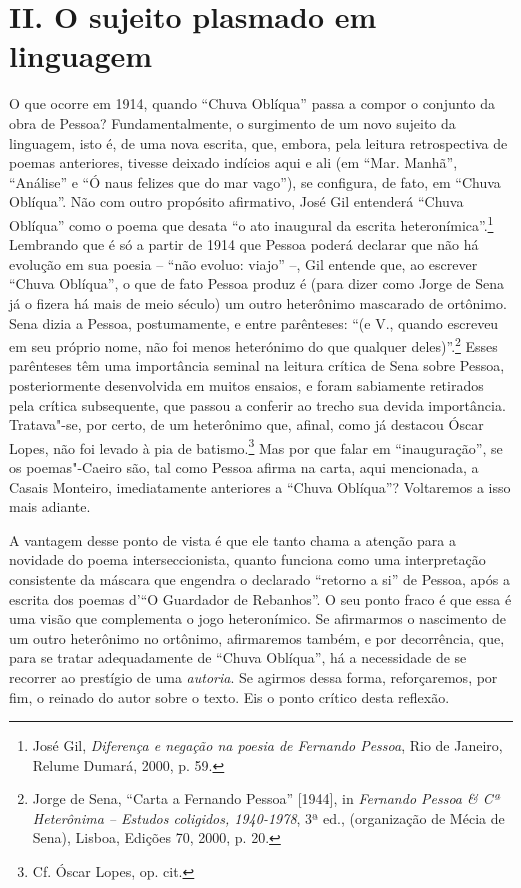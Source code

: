 \section*{II. O sujeito plasmado em linguagem}

O que ocorre em 1914, quando ``Chuva Oblíqua'' passa a compor o conjunto
da obra de Pessoa? Fundamentalmente, o surgimento de um novo sujeito da
linguagem, isto é, de uma nova escrita, que, embora, pela leitura
retrospectiva de poemas anteriores, tivesse deixado indícios aqui e ali
(em ``Mar. Manhã'', ``Análise'' e ``Ó naus felizes que do mar vago''),
se configura, de fato, em ``Chuva Oblíqua''. Não com outro propósito
afirmativo, José Gil entenderá ``Chuva Oblíqua'' como o poema que desata
``o ato inaugural da escrita heteronímica''.\footnote{José Gil,
  \emph{Diferença e negação na poesia de Fernando Pessoa}, Rio de
  Janeiro, Relume Dumará, 2000, p. 59.} Lembrando que é só a partir de
1914 que Pessoa poderá declarar que não há evolução em sua poesia --
``não evoluo: viajo'' --, Gil entende que, ao escrever ``Chuva
Oblíqua'', o que de fato Pessoa produz é (para dizer como Jorge de Sena
já o fizera há mais de meio século) um outro heterônimo mascarado de
ortônimo. Sena dizia a Pessoa, postumamente, e entre parênteses: ``(e
V., quando escreveu em seu próprio nome, não foi menos heterónimo do que
qualquer deles)''.\footnote{Jorge de Sena, ``Carta a Fernando Pessoa''
  {[}1944{]}, in \emph{Fernando Pessoa \& Cª Heterônima -- Estudos
  coligidos, 1940-1978}, 3ª ed., (organização de Mécia de Sena), Lisboa,
  Edições 70, 2000, p. 20.} Esses parênteses têm uma importância seminal
na leitura crítica de Sena sobre Pessoa, posteriormente desenvolvida em
muitos ensaios, e foram sabiamente retirados pela crítica subsequente,
que passou a conferir ao trecho sua devida importância. Tratava"-se, por
certo, de um heterônimo que, afinal, como já destacou Óscar Lopes, não
foi levado à pia de batismo.\footnote{Cf. Óscar Lopes, op. cit.} Mas por
que falar em ``inauguração'', se os poemas"-Caeiro são, tal como Pessoa
afirma na carta, aqui mencionada, a Casais Monteiro, imediatamente
anteriores a ``Chuva Oblíqua''? Voltaremos a isso mais adiante.

A vantagem desse ponto de vista é que ele tanto chama a atenção para a
novidade do poema interseccionista, quanto funciona como uma
interpretação consistente da máscara que engendra o declarado ``retorno
a si'' de Pessoa, após a escrita dos poemas d'``O Guardador de
Rebanhos''. O seu ponto fraco é que essa é uma visão que complementa o
jogo heteronímico. Se afirmarmos o nascimento de um outro heterônimo no
ortônimo, afirmaremos também, e por decorrência, que, para se tratar
adequadamente de ``Chuva Oblíqua'', há a necessidade de se recorrer ao
prestígio de uma \emph{autoria}. Se agirmos dessa forma, reforçaremos,
por fim, o reinado do autor sobre o texto. Eis o ponto crítico desta
reflexão.

